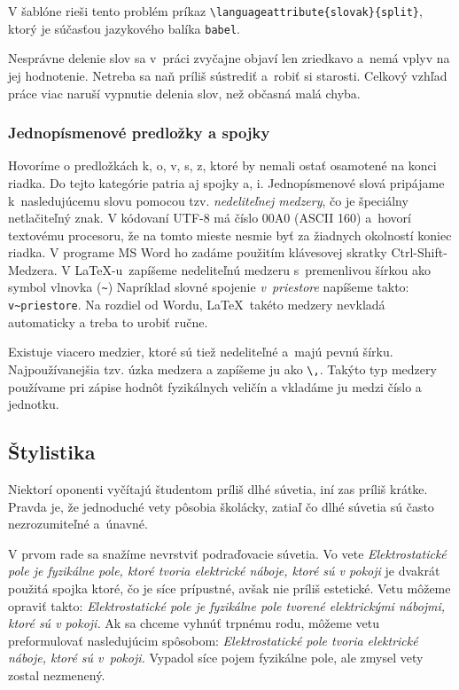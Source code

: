 V šablóne rieši tento problém príkaz
\verb|\languageattribute{slovak}{split}|,
ktorý je súčasťou jazykového balíka \verb|babel|.

Nesprávne delenie slov sa v~práci zvyčajne objaví
len zriedkavo a~nemá vplyv na jej hodnotenie.
Netreba sa naň príliš sústrediť a~robiť si starosti.
Celkový vzhľad práce viac naruší vypnutie delenia slov,
než občasná malá chyba.

\subsubsection{Jednopísmenové predložky a spojky}
Hovoríme o predložkách k, o, v, s, z,
ktoré by nemali ostať osamotené na konci riadka.
Do tejto kategórie patria aj spojky a, i.
Jednopísmenové slová pripájame k~nasledujúcemu slovu pomocou
tzv. \emph{nedeliteľnej medzery},
čo je špeciálny netlačiteľný znak.
V kódovaní UTF-8 má číslo 00A0 (ASCII 160)
a~hovorí textovému procesoru,
že na tomto mieste nesmie byť za žiadnych okolností
koniec riadka.
V programe MS Word ho zadáme použitím klávesovej skratky
Ctrl-Shift-Medzera.
V \LaTeX-u\ zapíšeme nedeliteľnú medzeru s~premenlivou šírkou
ako symbol vlnovka (\verb|~|)
Napríklad slovné spojenie \emph{v~priestore} napíšeme takto:
\verb|v~priestore|.
Na rozdiel od Wordu, \LaTeX\ takéto medzery nevkladá automaticky
a treba to urobiť ručne.

Existuje viacero medzier, ktoré sú tiež nedeliteľné a~majú pevnú šírku.
Najpoužívanejšia tzv. úzka medzera a zapíšeme ju ako \verb|\,|.
Takýto typ medzery používame pri zápise hodnôt fyzikálnych veličín a vkladáme ju medzi číslo a jednotku.

\subsection{Štylistika}
Niektorí oponenti vyčítajú študentom príliš dlhé súvetia,
iní zas príliš krátke.
Pravda je, že jednoduché vety pôsobia školácky,
zatiaľ čo dlhé súvetia sú často nezrozumiteľné a~únavné.

V prvom rade sa snažíme nevrstviť podraďovacie súvetia.
Vo vete \emph{Elektrostatické pole je fyzikálne pole,
ktoré tvoria elektrické náboje, ktoré sú v pokoji}
je dvakrát použitá spojka ktoré,
čo je síce prípustné, avšak nie príliš estetické.
Vetu môžeme opraviť takto:
\emph{Elektrostatické pole je fyzikálne
pole tvorené elektrickými nábojmi, ktoré sú v pokoji.}
Ak sa chceme vyhnúť trpnému rodu,
môžeme vetu preformulovať nasledujúcim spôsobom:
\emph{Elektrostatické pole tvoria elektrické náboje,
ktoré sú v~pokoji.}
Vypadol síce pojem fyzikálne pole,
ale zmysel vety zostal nezmenený.

